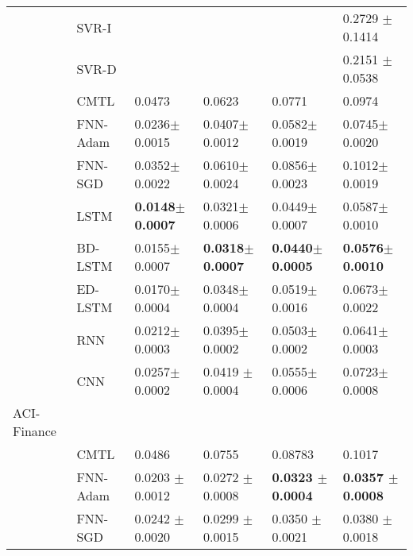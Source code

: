 \documentclass{ieeeaccess}
\begin{document}
\begin{table*}[htbp!]
\begin{tabular}{llllll}
 &  SVR-I \cite{zhang2013iterated}&   	&   &	 &  0.2729 $\pm $0.1414  \\
 
 & SVR-D \cite{zhang2013iterated} &   	&   &	 & 0.2151 $\pm $ 0.0538 \\
 
 
&CMTL \cite{chandra2017CMTLMulti} &   0.0473 &  0.0623  &0.0771	 & 0.0974  \\ 

&FNN-Adam & 0.0236$\pm$	0.0015     	&0.0407$\pm$	0.0012        &	0.0582$\pm$	0.0019       &0.0745$\pm$	0.0020\\

&FNN-SGD  &  0.0352$\pm$	0.0022    	& 0.0610$\pm$	0.0024       &	0.0856$\pm$	0.0023       &0.1012$\pm$	0.0019\\

&LSTM   &   \textbf{0.0148$\pm$	0.0007 }  	& 0.0321$\pm$	0.0006       &	0.0449$\pm$	0.0007       &0.0587$\pm$	0.0010\\

&BD-LSTM   &  0.0155$\pm$	0.0007    	&   \textbf{0.0318$\pm$	0.0007}     &\textbf{0.0440$\pm$	0.0005}	       &\textbf{0.0576$\pm$	0.0010}\\

&ED-LSTM   &   0.0170$\pm$	0.0004   	& 0.0348$\pm$	0.0004       &0.0519$\pm$	0.0016	       &0.0673$\pm$	0.0022\\

&RNN  &  0.0212$\pm$	0.0003    	& 0.0395$\pm$	0.0002       &0.0503$\pm$	0.0002	       &0.0641$\pm$	0.0003\\

&CNN &   0.0257$\pm$	0.0002   	& 	0.0419	$\pm$0.0004       &	0.0555$\pm$	0.0006       &0.0723$\pm$	0.0008\\
 \hline


 
 

ACI-Finance &    	  &	 &\\

&CMTL \cite{chandra2017CMTLMulti} &  0.0486  &  0.0755  &0.08783&0.1017  \\ 

&FNN-Adam & 0.0203 $\pm$  0.0012     	&  0.0272 $\pm$  0.0008       &\textbf{0.0323 $\pm$  0.0004}	       &\textbf{0.0357 $\pm$  0.0008}\\

&FNN-SGD  &   0.0242 $\pm$   0.0020 	&  0.0299 $\pm$   0.0015       &0.0350 $\pm$  0.0021	       &0.0380 $\pm$   0.0018\\


\end{tabular}
\end{table*}
\end{document}
